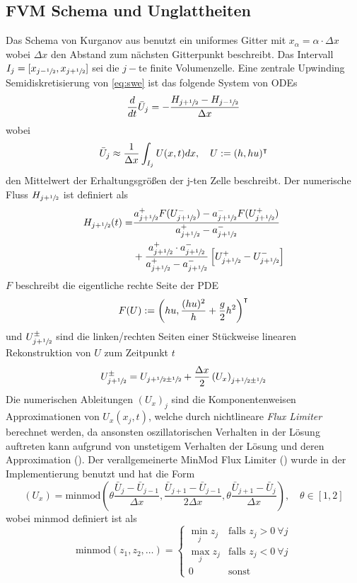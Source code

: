 \subsection{FVM Schema und Unglattheiten}
\label{sec:fvmFluxEigen}
Das Schema von Kurganov aus \cite{kurganov2007second} benutzt ein uniformes Gitter mit $x_\alpha=\alpha\cdot \Delta x$ wobei $\Delta x$ den Abstand zum nächsten Gitterpunkt beschreibt. Das Intervall $I_j = [x_{j-\sfrac{1}{2}},x_{j+\sfrac{1}{2}}]$ sei die $j-$te finite Volumenzelle.
Eine zentrale Upwinding Semidiskretisierung von \eqref{eq:swe} ist das folgende System von ODEs
\[
 \frac{d}{dt} \bar U_j = - \frac{H_{j+\sfrac{1}{2}}-H_{j-\sfrac{1}{2}}}{\Delta x}
\]
wobei 
\[
 \bar U_j \approx \frac{1}{\Delta x}\int_{I_j} U(x,t) dx, \quad U:=(h,hu)^\intercal
\]
den Mittelwert der Erhaltungsgrößen der j-ten Zelle beschreibt. Der numerische Fluss $H_{j+\sfrac{1}{2}}$ ist definiert als
\[
\begin{aligned}
 H_{j+\sfrac{1}{2}}(t) =& \frac{a^+_{j+\sfrac{1}{2}}F(U^-_{j+\sfrac{1}{2}}) - a^-_{j+\sfrac{1}{2}}F(U^+_{j+\sfrac{1}{2}})}{a^+_{j+\sfrac{1}{2}} -a^-_{j+\sfrac{1}{2}}} \\
 & +\frac{a^+_{j+\sfrac{1}{2}} \cdot a^-_{j+\sfrac{1}{2}}}{a^+_{j+\sfrac{1}{2}} -a^-_{j+\sfrac{1}{2}}}\left[U^+_{j+\sfrac{1}{2}} - U^-_{j+\sfrac{1}{2}}\right]
\end{aligned}
 \]
$F$ beschreibt die eigentliche rechte Seite der PDE
\[
 F(U) := \left( hu, \frac{(hu)^2}{h}  +\frac{g}{2} h^2 \right)^\intercal
\]
und $U^\pm_{j+\sfrac{1}{2}}$ sind die linken/rechten Seiten einer Stückweise linearen Rekonstruktion von $U$ zum Zeitpunkt $t$
\[
 U^\pm_{j+\sfrac{1}{2}} = U_{j+\sfrac{1}{2} \pm \sfrac{1}{2}} + \frac{\Delta x}{2} \left(U_x\right)_{j+\sfrac{1}{2}\pm\sfrac{1}{2}}
\]
Die numerischen Ableitungen $(U_x)_j$ sind die Komponentenweisen Approximationen von $U_x(x_j ,t)$, welche durch nichtlineare \textit{Flux Limiter} berechnet werden, 
da ansonsten oszillatorischen Verhalten in der Lösung auftreten kann aufgrund von unstetigem Verhalten der Lösung und deren Approximation (\cite[Abschnitt 6.6]{leveque2002finite}).
Der verallgemeinerte MinMod Flux Limiter (\cite[(4.9)]{kurganov2000new}) wurde in der Implementierung benutzt und hat die Form
\[
 \left(U_x\right) = \text{minmod}\left(\theta \frac{\bar U_j- \bar U_{j-1}}{\Delta x},\frac{\bar U_{j+1}- \bar U_{j-1}}{2\Delta x},\theta\frac{ \bar U_{j+1}- \bar U_{j}}{\Delta x}  \right), \quad \theta \in [1,2]
\]
wobei minmod definiert ist als
\[
 \text{minmod}(z_1,z_2,\ldots) = \begin{cases}
                                  \min_j z_j & \text{falls }z_j>0~\forall j\\
                                  \max_j z_j & \text{falls }z_j<0~\forall j\\
                                  0 & \text{sonst}
                                 \end{cases}
 \]
 
